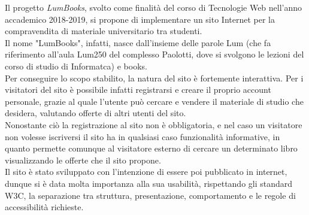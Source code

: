 Il progetto \emph{LumBooks}, svolto come finalità del corso di Tecnologie Web nell'anno accademico 2018-2019,
 si propone di implementare un sito Internet per la compravendita di materiale universitario tra studenti.\\
 Il nome "LumBooks", infatti, nasce dall'insieme delle parole Lum (che fa riferimento all'aula Lum250 del complesso Paolotti, dove si svolgono le lezioni del corso di studio di Informatca) e books.\\
Per conseguire lo scopo stabilito, la natura del sito è fortemente interattiva. Per i visitatori del sito è possibile infatti registrarsi e creare il proprio account personale, grazie al quale l'utente può cercare e vendere il materiale di studio che desidera, valutando offerte di altri utenti del sito.\\
Nonostante ciò la registrazione al sito non è obbligatoria, e nel caso un visitatore non volesse iscriversi il sito ha in qualsiasi caso funzionalità informative, in quanto permette comunque al visitatore esterno di cercare un determinato libro visualizzando le offerte che il sito propone.\\

Il sito è stato sviluppato con l’intenzione di essere poi pubblicato in internet, dunque si
è data molta importanza alla sua usabilità, rispettando gli standard W3C, la separazione tra struttura, presentazione, comportamento e le regole di accessibilità richieste.